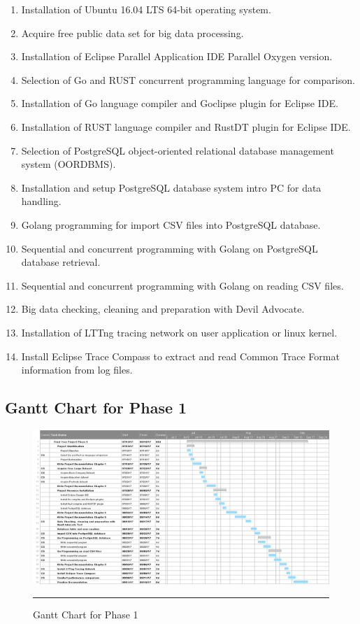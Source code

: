 \begin{enumerate}[topsep=0pt,itemsep=-1ex,partopsep=1ex,parsep=1.5ex]
	
\item Installation of Ubuntu 16.04 LTS 64-bit operating system.
\item Acquire free public data set for big data processing.
\item Installation of  Eclipse Parallel Application IDE Parallel Oxygen version. 
\item Selection of Go and RUST concurrent programming language for comparison.
\item Installation of Go language compiler and Goclipse plugin for Eclipse IDE.
\item Installation of RUST language compiler and RustDT plugin for Eclipse IDE.
\item Selection of PostgreSQL object-oriented relational database management system (OORDBMS).
\item Installation and setup PostgreSQL database system intro PC for data handling.
\item Golang programming for import CSV files into PostgreSQL database.
\item Sequential and concurrent programming with Golang on PostgreSQL database retrieval.
\item Sequential and concurrent programming with Golang on reading CSV files.
\item Big data checking, cleaning and preparation with Devil Advocate. 
\item Installation of LTTng tracing network on user application or linux kernel.
\item Install Eclipse Trace Compass to extract and read Common Trace Format information from log files.

\end{enumerate}

\begin{landscape}
	\subsection{Gantt Chart for Phase 1}
	\begin{figure}[H]
		\centering
		\includegraphics[width=1.5\textwidth]{Figure/Gantt1.png}
		\rule{35em}{0.5pt}
		\caption[Gantt Chart for Phase 1]{Gantt Chart for Phase 1}
	\end{figure}
\end{landscape}


